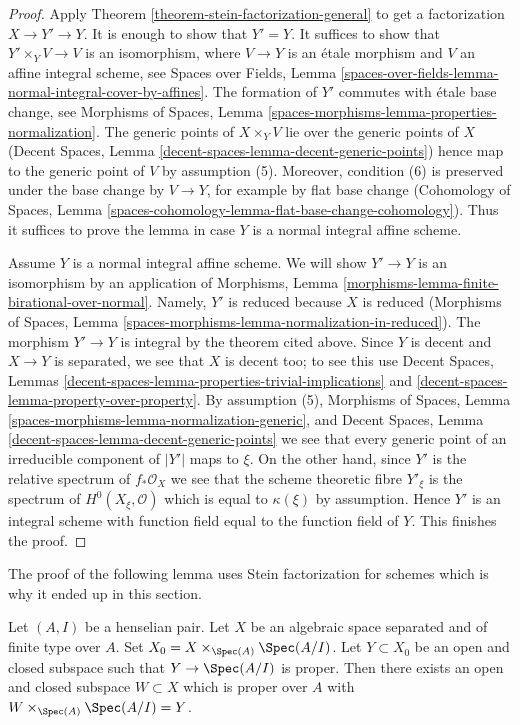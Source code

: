 \begin{proof}
Apply Theorem \ref{theorem-stein-factorization-general} to get a
factorization $X \to Y' \to Y$. It is enough to show that $Y' = Y$.
It suffices to show that $Y' \times_Y V \to V$ is an isomorphism,
where $V \to Y$ is an \'etale morphism and $V$ an affine integral scheme,
see Spaces over Fields, Lemma
\ref{spaces-over-fields-lemma-normal-integral-cover-by-affines}.
The formation of $Y'$ commutes with \'etale base change, see
Morphisms of Spaces, Lemma
\ref{spaces-morphisms-lemma-properties-normalization}.
The generic points of $X \times_Y V$ lie over the generic points of $X$
(Decent Spaces, Lemma \ref{decent-spaces-lemma-decent-generic-points})
hence map to the generic point of $V$ by assumption (5). Moreover, condition
(6) is preserved under the base change by $V \to Y$, for example by
flat base change (Cohomology of Spaces, Lemma
\ref{spaces-cohomology-lemma-flat-base-change-cohomology}).
Thus it suffices to prove the lemma in case $Y$ is a normal
integral affine scheme.

\medskip\noindent
Assume $Y$ is a normal integral affine scheme. We will show $Y' \to Y$
is an isomorphism by an application of Morphisms, Lemma
\ref{morphisms-lemma-finite-birational-over-normal}.
Namely, $Y'$ is reduced because $X$ is reduced (Morphisms of Spaces, Lemma
\ref{spaces-morphisms-lemma-normalization-in-reduced}).
The morphism $Y' \to Y$ is integral by the theorem cited above.
Since $Y$ is decent and $X \to Y$ is separated, we see that
$X$ is decent too; to see this use
Decent Spaces, Lemmas
\ref{decent-spaces-lemma-properties-trivial-implications} and
\ref{decent-spaces-lemma-property-over-property}. By assumption (5),
Morphisms of Spaces, Lemma \ref{spaces-morphisms-lemma-normalization-generic},
and Decent Spaces, Lemma \ref{decent-spaces-lemma-decent-generic-points}
we see that every generic point of an irreducible component of $|Y'|$
maps to $\xi$. On the other hand, since $Y'$ is the relative
spectrum of $f_*\mathcal{O}_X$ we see that the scheme theoretic fibre
$Y'_\xi$ is the spectrum of $H^0(X_\xi, \mathcal{O})$ which is
equal to $\kappa(\xi)$ by assumption. Hence $Y'$ is an integral
scheme with function field equal to the function field of $Y$.
This finishes the proof.
\end{proof}

\noindent
The proof of the following lemma uses Stein factorization for schemes
which is why it ended up in this section.

\begin{lemma}
\label{lemma-split-off-proper-part-henselian}
Let $(A, I)$ be a henselian pair. Let $X$ be an algebraic space
separated and of finite type over $A$. Set
$X_0 = X \times_{\Spec(A)} \Spec(A/I)$.
Let $Y \subset X_0$ be an open and closed subspace such that
$Y \to \Spec(A/I)$ is proper. Then there exists an open and closed
subspace $W \subset X$ which is proper over $A$ with
$W \times_{\Spec(A)} \Spec(A/I) = Y$.
\end{lemma}

